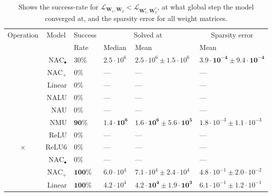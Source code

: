 \begin{table}[H]

\caption{\label{tab:function-task-static-defaults-all}Shows the success-rate for $\mathcal{L}_{\mathbf{W}_1, \mathbf{W}_2} < \mathcal{L}_{\mathbf{W}_1^\epsilon, \mathbf{W}_2^*}$, at what global step the model converged at, and the sparsity error for all weight matrices.}
\centering
\begin{tabular}{crllll}
\toprule
\multicolumn{1}{c}{Operation} & \multicolumn{1}{c}{Model} & \multicolumn{1}{c}{Success} & \multicolumn{2}{c}{Solved at} & \multicolumn{1}{c}{Sparsity error} \\
\cmidrule(l{3pt}r{3pt}){1-1} \cmidrule(l{3pt}r{3pt}){2-2} \cmidrule(l{3pt}r{3pt}){3-3} \cmidrule(l{3pt}r{3pt}){4-5} \cmidrule(l{3pt}r{3pt}){6-6}
 &  & Rate & Median & Mean & Mean\\
\midrule
 & $\mathrm{NAC}_{\bullet}$ & $30\%$ & $2.5 \cdot 10^{6}$ & $2.5 \cdot 10^{6} \pm 1.5 \cdot 10^{6}$ & $\mathbf{3.9 \cdot 10^{-4} \pm 9.4 \cdot 10^{-4}}$\\

 & $\mathrm{NAC}_{+}$ & $0\%$ & --- & --- & ---\\

 & Linear & $0\%$ & --- & --- & ---\\

 & NALU & $0\%$ & --- & --- & ---\\

 & NAU & $0\%$ & --- & --- & ---\\

 & NMU & $\mathbf{90\%}$ & $\mathbf{1.4 \cdot 10^{6}}$ & $\mathbf{1.6 \cdot 10^{6} \pm 5.6 \cdot 10^{5}}$ & $1.8 \cdot 10^{-3} \pm 1.1 \cdot 10^{-3}$\\

 & ReLU & $0\%$ & --- & --- & ---\\

\multirow{-8}{*}{\centering\arraybackslash $\bm{\times}$} & ReLU6 & $0\%$ & --- & --- & ---\\
\cmidrule{1-6}
 & $\mathrm{NAC}_{\bullet}$ & $0\%$ & --- & --- & ---\\

 & $\mathrm{NAC}_{+}$ & $\mathbf{100\%}$ & $6.0 \cdot 10^{4}$ & $7.1 \cdot 10^{4} \pm 2.4 \cdot 10^{4}$ & $4.8 \cdot 10^{-1} \pm 2.0 \cdot 10^{-2}$\\

 & Linear & $\mathbf{100\%}$ & $4.2 \cdot 10^{4}$ & $\mathbf{4.2 \cdot 10^{4} \pm 1.9 \cdot 10^{3}}$ & $6.1 \cdot 10^{-1} \pm 1.2 \cdot 10^{-1}$\\


\end{tabular}
\end{table}
